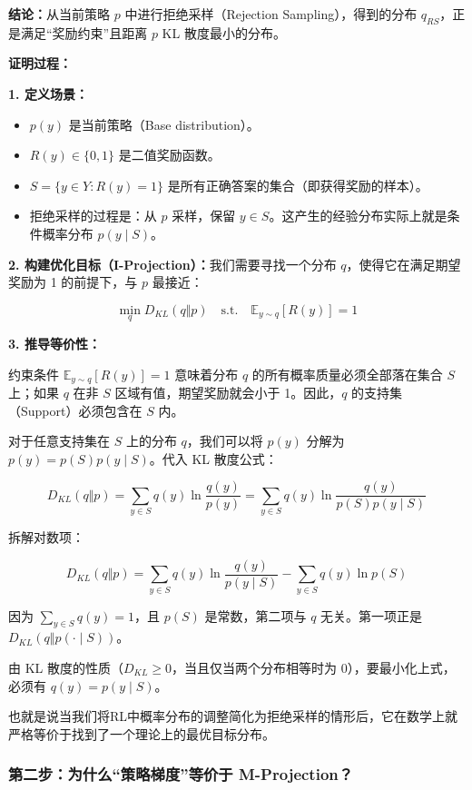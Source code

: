 \textbf{结论：}从当前策略 \(p\) 中进行拒绝采样（Rejection Sampling），得到的分布 \(q_{RS}\)，正是满足``奖励约束''且距离 \(p\) KL 散度最小的分布。

\textbf{证明过程：}

\textbf{1. 定义场景：}

\begin{itemize}
\tightlist
\item
  \(p(y)\) 是当前策略（Base distribution）。
\item
  \(R(y) \in \{0,1\}\) 是二值奖励函数。
\item
  \(S=\{y\in Y:R(y)=1\}\) 是所有正确答案的集合（即获得奖励的样本）。
\item
  拒绝采样的过程是：从 \(p\) 采样，保留 \(y\in S\)。这产生的经验分布实际上就是条件概率分布 \(p(y\mid S)\)。
\end{itemize}

\textbf{2. 构建优化目标（I-Projection）：}我们需要寻找一个分布 \(q\)，使得它在满足期望奖励为 1 的前提下，与 \(p\) 最接近：

\[
\min_q D_{KL}(q\Vert p) \quad \mathrm{s.t.}\quad \mathbb{E}_{y\sim q}[R(y)] = 1
\]

\textbf{3. 推导等价性：}

约束条件 \(\mathbb{E}_{y\sim q}[R(y)]=1\) 意味着分布 \(q\) 的所有概率质量必须全部落在集合 \(S\) 上；如果 \(q\) 在非 \(S\) 区域有值，期望奖励就会小于 1。因此，\(q\) 的支持集（Support）必须包含在 \(S\) 内。

对于任意支持集在 \(S\) 上的分布 \(q\)，我们可以将 \(p(y)\) 分解为 \(p(y)=p(S)p(y\mid S)\)。代入 KL 散度公式：

\[
D_{KL}(q\Vert p)
= \sum_{y\in S} q(y)\ln\frac{q(y)}{p(y)}
= \sum_{y\in S} q(y)\ln\frac{q(y)}{p(S)p(y\mid S)}
\]

拆解对数项：

\[
D_{KL}(q\Vert p)
= \sum_{y\in S} q(y)\ln\frac{q(y)}{p(y\mid S)}
- \sum_{y\in S} q(y)\ln p(S)
\]

因为 \(\sum_{y\in S}q(y)=1\)，且 \(p(S)\) 是常数，第二项与 \(q\) 无关。第一项正是 \(D_{KL}(q\Vert p(\cdot\mid S))\)。

由 KL 散度的性质（\(D_{KL}\ge 0\)，当且仅当两个分布相等时为 0），要最小化上式，必须有 \(q(y)=p(y\mid S)\)。

也就是说当我们将RL中概率分布的调整简化为拒绝采样的情形后，它在数学上就严格等价于找到了一个理论上的最优目标分布。

\hypertarget{ux7b2cux4e8cux6b65ux4e3aux4ec0ux4e48ux7b56ux7565ux68afux5ea6ux7b49ux4ef7ux4e8e-m-projection}{%
\subsubsection{第二步：为什么``策略梯度''等价于 M-Projection？}\label{ux7b2cux4e8cux6b65ux4e3aux4ec0ux4e48ux7b56ux7565ux68afux5ea6ux7b49ux4ef7ux4e8e-m-projection}}

